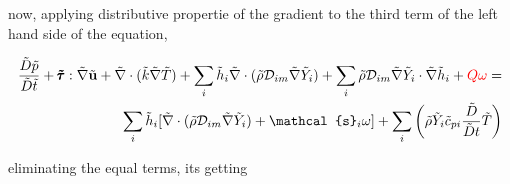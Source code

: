 \documentclass[preprint,12pt,authoryear]{elsarticle}
\begin{document}
now, applying distributive propertie of the gradient to the third term  of the left hand side of the equation, 

\begin{equation}
\begin{split}
        \frac{\tilde{D} \tilde{p}}{\tilde{D}\tilde{t}}
        +       
        \pmb{\tilde{\tau}}:\tilde{\nabla} \tilde{\mathbf{u}} 
        + 
        \tilde{\nabla} \cdot (\tilde{k}\tilde{\nabla} \tilde{T})
        +
        \sum\limits_i
        \tilde{h}_i
        \tilde{\nabla}\cdot
	(
	\tilde{\rho}\mathcal{D}_{im}\tilde{\nabla}\tilde{Y}_i
	)
        +
        \sum\limits_i 
        \tilde{\rho}
        \mathcal{D}_{im}
        \tilde{\nabla}
        \tilde{Y}_i     
        \cdot
        \tilde{\nabla} 
        \tilde{h}_i
        +
        {\color{red} Q\omega}
        =
\\
        \sum\limits_i
        \tilde{h}_i
        [
        	\tilde{\nabla}\cdot
		(
		\tilde{\rho}\mathcal{D}_{im}\tilde{\nabla}\tilde{Y}_i
		)
		+
        	\mathcal{s}_i \omega
	    ]
        +
        \sum\limits_i
        \left(
                \tilde{\rho}
                \tilde{Y}_i
                \tilde{c}_{pi}
                \frac{\tilde{D}}{\tilde{D} t}
                \tilde{T}
        \right)
\end{split}
\end{equation}

eliminating the equal terms, its getting  
\end{document}
